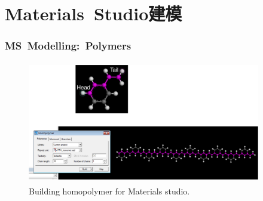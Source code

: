 %
\section{\rm{Materials~Studio}建模}
\frame
{
	\frametitle{\textrm{MS~Modelling:~Polymers}}
\begin{figure}[h!]
\centering
\vspace*{-0.05in}
\includegraphics[height=2.10in,width=4.00in,viewport=0 0 1280 650,clip]{Figures/MS-Building_homopolymer.png}
\caption{\tiny \textrm{Building homopolymer for Materials studio.}}%
\label{MS-Building_homopolymer}
\end{figure}
}

